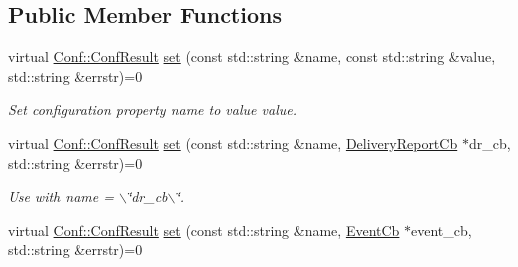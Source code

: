 \subsection*{Public Member Functions}
\begin{DoxyCompactItemize}
\item 
virtual \hyperlink{classRdKafka_1_1Conf_a1d023a689c09f42ab18b7bd1d15a11a6}{Conf::ConfResult} \hyperlink{classRdKafka_1_1Conf_ac122170f07773c5228916a3392929f20}{set} (const std::string \&name, const std::string \&value, std::string \&errstr)=0
\begin{DoxyCompactList}\small\item\em Set configuration property {\ttfamily name} to value {\ttfamily value}. \item\end{DoxyCompactList}\item 
\hypertarget{classRdKafka_1_1Conf_a3f6ff1cfaac16542927c3b21daa885a4}{
virtual \hyperlink{classRdKafka_1_1Conf_a1d023a689c09f42ab18b7bd1d15a11a6}{Conf::ConfResult} \hyperlink{classRdKafka_1_1Conf_a3f6ff1cfaac16542927c3b21daa885a4}{set} (const std::string \&name, \hyperlink{classRdKafka_1_1DeliveryReportCb}{DeliveryReportCb} $\ast$dr\_\-cb, std::string \&errstr)=0}
\label{classRdKafka_1_1Conf_a3f6ff1cfaac16542927c3b21daa885a4}

\begin{DoxyCompactList}\small\item\em Use with {\ttfamily name} = {\ttfamily $\backslash$\char`\"{}dr\_\-cb$\backslash$\char`\"{}}. \item\end{DoxyCompactList}\item 
\hypertarget{classRdKafka_1_1Conf_a1230e95b69f64acfd5e0a3cacb9b593f}{
virtual \hyperlink{classRdKafka_1_1Conf_a1d023a689c09f42ab18b7bd1d15a11a6}{Conf::ConfResult} \hyperlink{classRdKafka_1_1Conf_a1230e95b69f64acfd5e0a3cacb9b593f}{set} (const std::string \&name, \hyperlink{classRdKafka_1_1EventCb}{EventCb} $\ast$event\_\-cb, std::string \&errstr)=0}
\label{classRdKafka_1_1Conf_a1230e95b69f64acfd5e0a3cacb9b593f}


\end{DoxyCompactItemize}
